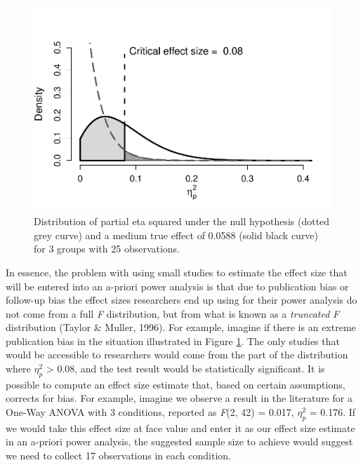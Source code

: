 \documentclass[
  english,
  ,jou, a4paper,floatsintext]{apa6}
\begin{document}
\begin{figure}
\centering
\includegraphics{sample_size_justification_files/figure-latex/follow-up-bias-1.pdf}
\caption{\label{fig:follow-up-bias}Distribution of partial eta squared under the null hypothesis (dotted grey curve) and a medium true effect of 0.0588 (solid black curve) for 3 groups with 25 observations.}
\end{figure}

In essence, the problem with using small studies to estimate the effect size that will be entered into an a-priori power analysis is that due to publication bias or follow-up bias the effect sizes researchers end up using for their power analysis do not come from a full \emph{F} distribution, but from what is known as a \emph{truncated} \emph{F} distribution (Taylor \& Muller, 1996). For example, imagine if there is an extreme publication bias in the situation illustrated in Figure \ref{fig:follow-up-bias}. The only studies that would be accessible to researchers would come from the part of the distribution where \(\eta_p^2\) \textgreater{} 0.08, and the test result would be statistically significant. It is possible to compute an effect size estimate that, based on certain assumptions, corrects for bias. For example, imagine we observe a result in the literature for a One-Way ANOVA with 3 conditions, reported as \emph{F}(2, 42) = 0.017, \(\eta_p^2\) = 0.176. If we would take this effect size at face value and enter it as our effect size estimate in an a-priori power analysis, the suggested sample size to achieve would suggest we need to collect 17 observations in each condition.
\end{document}
